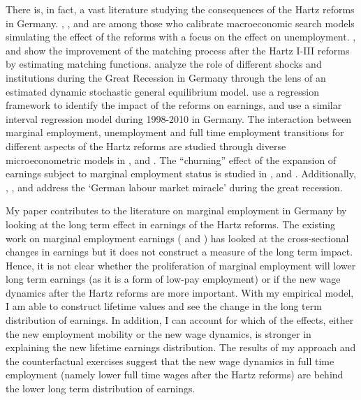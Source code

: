 \documentclass[12pt, a4paper]{article}
\begin{document}
There is, in fact, a vast literature studying the consequences of the Hartz reforms in Germany. \cite{KrauseUhlig12}, \cite{KrebsScheffer13}, \cite{LaunovWalde13a} and \cite{BradleyKugler2019} are among those who calibrate macroeconomic search models simulating the effect of the reforms with a focus on the effect on unemployment. \cite{FahrSunde09}, \cite{KlingerRothe12} and \cite{HertweckSigrist2012} show the improvement of the matching process after the Hartz I-III reforms by estimating matching functions. \cite{GehrkeLechthalerMerkl2019} analyze the role of different shocks and institutions during the Great Recession in Germany through the lens of an estimated dynamic stochastic general equilibrium model. \cite{EngbomDetragiacheRaei15} use a regression framework to identify the impact of the reforms on earnings, and \cite{GiannelliJaenichenRothe2013} use a similar interval regression model during 1998-2010 in Germany. The interaction between marginal employment, unemployment and full time employment transitions for different aspects of the Hartz reforms are studied through diverse microeconometric models in \cite{CaliendoWrohlick10}, \cite{Caliendo2016} and \cite{Price16}. The ``churning'' effect of the expansion of earnings subject to marginal employment status is studied in \cite{Galasi17}, \cite{Tazhitdinova2017} and \cite{GudgeonTrenkle2019}. Additionally, \cite{Moller2010}, \cite{BurdaHunt11}, \cite{DuSpOe14} and \cite{BellmannGernerLaible2016} address the `German labour market miracle' during the great recession.

My paper contributes to the literature on marginal employment in Germany by looking at the long term effect in earnings of the Hartz reforms. The existing work on marginal employment earnings (\cite{DuLuSc09} and \cite{CaLaRo18}) has looked at the cross-sectional changes in earnings but it does not construct a measure of the long term impact. Hence, it is not clear whether the proliferation of marginal employment will lower long term earnings (as it is a form of low-pay employment) or if the new wage dynamics after the Hartz reforms are more important. With my empirical model, I am able to construct lifetime values and see the change in the long term distribution of earnings. In addition, I can account for which of the effects, either the new employment mobility or the new wage dynamics, is stronger in explaining the new lifetime earnings distribution. The results of my approach and the counterfactual exercises suggest that the new wage dynamics in full time employment (namely lower full time wages after the Hartz reforms) are behind the lower long term distribution of earnings.
\end{document}

